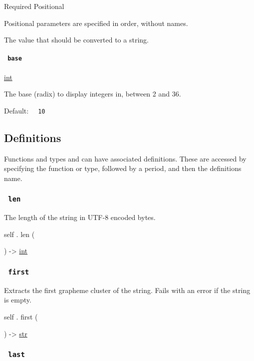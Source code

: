 {Required} {{ Positional }}

\label{constructor-value-positional-tooltip}
Positional parameters are specified in order, without names.

The value that should be converted to a string.

\paragraph{\texorpdfstring{\texttt{\ base\ }}{ base }}\label{constructor-base}

\href{/docs/reference/foundations/int/}{int}

The base (radix) to display integers in, between 2 and 36.

Default: \texttt{\ }{\texttt{\ 10\ }}\texttt{\ }

\subsection{\texorpdfstring{{ Definitions
}}{ Definitions }}\label{definitions}

\label{definitions-tooltip}
Functions and types and can have associated definitions. These are
accessed by specifying the function or type, followed by a period, and
then the definition\textquotesingle s name.

\subsubsection{\texorpdfstring{\texttt{\ len\ }}{ len }}\label{definitions-len}

The length of the string in UTF-8 encoded bytes.

self { . } { len } (

) -\textgreater{} \href{/docs/reference/foundations/int/}{int}

\subsubsection{\texorpdfstring{\texttt{\ first\ }}{ first }}\label{definitions-first}

Extracts the first grapheme cluster of the string. Fails with an error
if the string is empty.

self { . } { first } (

) -\textgreater{} \href{/docs/reference/foundations/str/}{str}

\subsubsection{\texorpdfstring{\texttt{\ last\ }}{ last }}\label{definitions-last}

